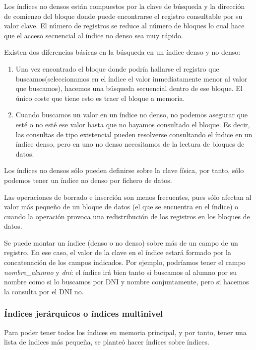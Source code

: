 \documentclass[10pt,a4paper,spanish]{report}
\begin{document}
Los índices no densos están compuestos por la clave de búsqueda y la dirección de comienzo del bloque donde puede encontrarse el registro consultable por su valor clave. El número de registros se reduce al número de bloques lo cual hace que el acceso secuencial al índice no denso sea muy rápido.



Existen dos diferencias básicas en la búsqueda en un índice denso y no denso:
\begin{enumerate}[$\heartsuit$]
    \item Una vez encontrado el bloque donde podría hallarse el registro que buscamos(seleccionamos en el índice el valor inmediatamente menor al valor que buscamos), hacemos una  búsqueda secuencial dentro de ese bloque. El único coste que tiene esto es traer el bloque a memoria.
    \item Cuando buscamos un valor en un índice no denso, no podemos asegurar que esté o no esté ese valor hasta que no hayamos consultado el bloque. Es decir, las consultas de tipo existencial pueden resolverse consultando el índice en un índice denso, pero en uno no denso necesitamos de la lectura de bloques de datos.
\end{enumerate}

Los índices no densos sólo pueden definirse sobre la clave física, por tanto, sólo podemos tener un índice no denso por fichero de datos.

Las operaciones de borrado e inserción son menos frecuentes, pues sólo afectan al valor más pequeño de un bloque de datos (el que se encuentra en el índice) o cuando la operación provoca una redistribución de los registros en los bloques de datos.

Se puede montar un índice (denso o no denso) sobre más de un campo de un registro. En ese caso, el valor de la clave en el índice estará formado por la concatenación de los campos indicados. Por ejemplo, podríamos tener el campo \textit{nombre\_alumno} y \textit{dni}: el índice irá bien tanto si buscamos al alumno por su nombre como si lo buscamos por DNI y nombre conjuntamente, pero si hacemos la consulta por el DNI no.

\newpage
\textcolor[rgb]{1,0.2,0.3}{\subsubsection{Índices jerárquicos o índices multinivel}}
Para poder tener todos los índices en memoria principal, y por tanto, tener una lista de índices más pequeña, se planteó hacer índices sobre índices.
\end{document}
